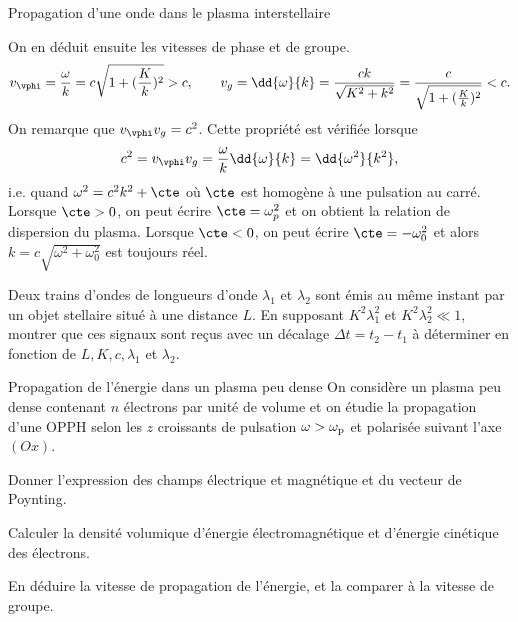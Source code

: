 \begin{exo}[PC][2][TD]{Propagation d'une onde dans le plasma interstellaire}
\begin{quest}
{On en déduit ensuite les vitesses de phase et de groupe.
 $$
v_\vphi = \frac{\omega}{k} = c\sqrt{1+(\frac{K}{k})^2} >c, \qquad v_g = \dd{\omega}{k} = \frac{ck}{\sqrt{K^2+k^2}} = \frac{c}{\sqrt{1+(\frac{K}{k})^2}} < c.
 $$
 On remarque que $v_\vphi v_g =c^2$. Cette propriété est vérifiée lorsque
 $$
c^2 = v_\vphi v_g = \frac{\omega}{k}\dd{\omega}{k} = \dd{\omega^2}{k^2},
 $$
 i.e. quand $\omega^2 = c^2k^2 + \cte$ où $\cte$ est homogène à une pulsation au carré. Lorsque $\cte > 0$, on peut écrire $\cte = \omega_p^2$ et on obtient la relation de dispersion du plasma. Lorsque $\cte<0$, on peut écrire $\cte = -\omega_0^2$ et alors $k = c \sqrt{\omega^2 + \omega_0^2}$ est toujours réel.
}
\item Deux trains d'ondes de longueurs d'onde $\lambda_1$ et $\lambda_2$ sont émis au même instant par un objet stellaire situé à une distance $L$. En supposant $K^2\lambda_1^2$ et $K^2\lambda_2^2\ll 1$, montrer que ces signaux sont reçus avec un décalage $\Delta t=t_2-t_1$ à déterminer en fonction de $L,K,c,\lambda_1$ et $\lambda_2$.
\end{quest}
\end{exo}

\begin{exo}[PC]{Propagation de l'énergie dans un plasma peu dense}
On considère un plasma peu dense contenant $n$ électrons par unité de volume et on étudie la propagation d'une OPPH selon les $z$ croissants de pulsation $\omega>\omega_{\rm{p}}$ et polarisée suivant l'axe $(Ox)$.
\begin{quest}
\item Donner l'expression des champs électrique et magnétique et du vecteur de Poynting.
\item Calculer la densité volumique d'énergie électromagnétique et d'énergie cinétique des électrons.
\item En déduire la vitesse de propagation de l'énergie, et la comparer à la vitesse de groupe.
\end{quest}
\end{exo}


